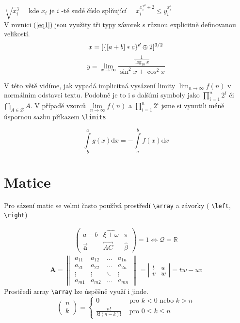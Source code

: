 \documentclass[a4paper, 11pt, twocolumn]{article}
\begin{document}
\bigskip
\noindent$\sqrt[i]{x_{i}^{3}} \quad$ kde $x_{i}$ je $i$ -té sudé číslo splňující $\quad x_{i}^{x_{i}^{x^{2}}+2} \leq y_{i}^{x_{i}^{4}}$\\

V rovnici (\ref{eq1}) jsou využity tři typy závorek s různou explicitně definovanou velikostí.
\begin{equation}\label{eq1}
x=[\{[a+b] * c\}^{d} \oplus 2]^{3 / 2}\\
\end{equation}
\[y=\lim _{x \rightarrow \infty} \frac{\frac{1}{\log _{10} x}}{\sin ^{2} x+\cos ^{2} x}\]

V této větě vidíme, jak vypadá implicitná vysázení limity
$\lim _{n \rightarrow \infty} f(n)$
v normálním odstavci textu. Podobně je to i s dalšími symboly jako
$\prod_{i=1}^{n} 2^{i}$ či $\bigcap_{A \in \mathcal{B}} A$.
V případě vzorců 
$\lim\limits_{n \rightarrow \infty} f(n)$ a $\prod\limits_{i=1}^{n} 2^{i}$
jsme si vynutili méně úspornou sazbu příkazem \verb=\limits=

\begin{equation}\label{eq2}
\int\limits_{b}^{a} g(x) \mathrm{d} x=-\int\limits_{a}^{b} f(x) \mathrm{d} x
\end{equation}


\section{Matice}
Pro sázení matic se velmi často používá prostředí \verb=\array= a závorky ( \verb=\left=,  \verb=\right=)

\begin{align*}
\left(\begin{array}{ccc}
a-b & \widehat{\xi+\omega} & \pi \\
\overrightarrow{\mathbf{a}} & \stackrel{\leftrightarrow}{A C} & \hat{\beta}
\end{array}\right)=1 \Longleftrightarrow \mathcal{Q}=\mathbb{R}
\end{align*}
\begin{align*}
\mathbf{A}=\left\|\begin{array}{cccc}
a_{11} & a_{12} & \ldots & a_{1 n} \\
a_{21} & a_{22} & \ldots & a_{2 n} \\
\vdots & \vdots & \ddots & \vdots \\
a_{m 1} & a_{m 2} & \ldots & a_{m n}
\end{array}\right\|=\left|\begin{array}{cc}
t & u \\
v & w
\end{array}\right|=t w-u v
\end{align*}
Prostředí array \verb=\array= lze úspěšně využí i jinde.
\[\left(\begin{array}{l}n \\ k\end{array}\right)=\left\{\begin{array}{cl}0 & \text { pro } k<0 \text { nebo } k>n \\ \frac{n !}{k !(n-k) !} & \text { pro } 0 \leq k \leq n\end{array}\right.\]
\end{document}
